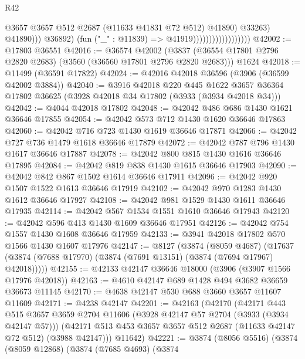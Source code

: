 \begin{lexlean}{R42}
\begin{coremodule}
                                                  @3657
                                                  @3657
                                                  @512
                                                  @2687
                                                  (@11633 @41831 @72 @512)
                                                  @41890)
                                                @33263)
                                              @41890)))
                                        @36892)
                                      (fun ("_" : @11839) => @41919))))))))))))))))))
@42002 := @17803 @36551
@42016 := @36574
    @42002
    (@3837 (@36554 @17801 @2796 @2820 @2683) (@3560 (@36560 @17801 @2796 @2820 @2683)))
    @1624
@42018 := @11499 (@36591 @17822)
@42024 := @42016 @42018 @36596 (@3906 (@36599 @42002 @3884))
@42040 := @3916
    @42018
    @220
    @445
    @1622
    @3657
    @36364
    @17802
    @36625
    (@3928 @42018 @34 @17802 (@3933 (@3934 @42018 @34)))
@42042 := @4044 @42018 @17802
@42048 := @42042 @486 @686 @1430 @1621 @36646 @17855
@42054 := @42042 @573 @712 @1430 @1620 @36646 @17863
@42060 := @42042 @716 @723 @1430 @1619 @36646 @17871
@42066 := @42042 @727 @736 @1479 @1618 @36646 @17879
@42072 := @42042 @787 @796 @1430 @1617 @36646 @17887
@42078 := @42042 @800 @815 @1430 @1616 @36646 @17895
@42084 := @42042 @819 @838 @1430 @1615 @36646 @17903
@42090 := @42042 @842 @867 @1502 @1614 @36646 @17911
@42096 := @42042 @920 @1507 @1522 @1613 @36646 @17919
@42102 := @42042 @970 @1283 @1430 @1612 @36646 @17927
@42108 := @42042 @981 @1529 @1430 @1611 @36646 @17935
@42114 := @42042 @567 @1534 @1551 @1610 @36646 @17943
@42120 := @42042 @596 @413 @1430 @1609 @36646 @17951
@42126 := @42042 @754 @1557 @1430 @1608 @36646 @17959
@42133 := @3941 @42018 @17802 @570 @1566 @1430 @1607 @17976
@42147 := @8127
    (@3874
      (@8059 @4687)
      (@17637 (@3874 (@7688 @17970) (@3874 (@7691 @13151) (@3874 (@7694 @17967) @42018)))))
@42155 := @42133 @42147 @36646 @18000 (@3906 (@3907 @1566 @17976 @42018))
@42163 := @4610 @42147 @689 @1428 @494 @3682 @36659 @36673 @11145
@42170 := @4638 @42147 @530 @688 @3660 @3657 @11607 @11609
@42171 := @4238 @42147
@42201 := @42163
    (@42170
      (@42171
        @443
        @515
        @3657
        @3659
        @2704
        @11606
        (@3928 @42147 @57 @2704 (@3933 (@3934 @42147 @57)))
        (@42171 @513 @453 @3657 @3657 @512 @2687 (@11633 @42147 @72 @512) (@3988 @42147)))
      @11642)
@42221 := @3874
    (@8056 @5516)
    (@3874
      (@8059 @12868)
      (@3874
        (@7685 @4693)
        (@3874

\end{coremodule}
\end{lexlean}
